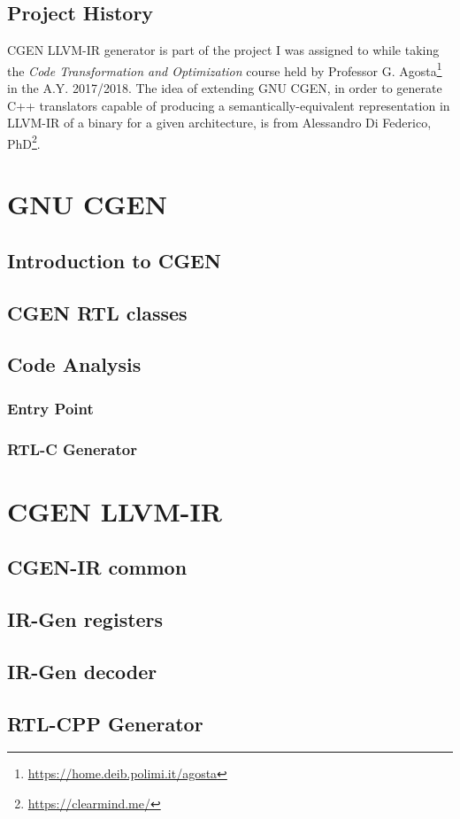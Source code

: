 \documentclass{article}
\begin{document}
\subsection{Project History}
CGEN LLVM-IR generator is part of the project I was assigned to while taking the \emph{Code Transformation and Optimization} course held by Professor G. Agosta\footnote{\url{https://home.deib.polimi.it/agosta}} in the A.Y. 2017/2018. The idea of extending GNU CGEN, in order to generate C++ translators capable of producing a semantically-equivalent representation in LLVM-IR of a binary for a given architecture, is from Alessandro Di Federico, PhD\footnote{\url{https://clearmind.me/}}. 

\clearpage
\section{GNU CGEN}
\subsection{Introduction to CGEN}
\subsection{CGEN RTL classes}
\subsection{Code Analysis}
\subsubsection{Entry Point}
\subsubsection{RTL-C Generator}

\clearpage
\section{CGEN LLVM-IR}
\subsection{CGEN-IR common}
\subsection{IR-Gen registers}
\subsection{IR-Gen decoder}
\subsection{RTL-CPP Generator}
\end{document}
